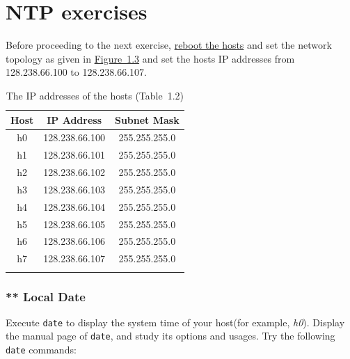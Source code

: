 \documentclass{UTNetLab}
\begin{document}
\part{NTP exercises}
   Before proceeding to the next exercise, \underline{reboot the hosts} and set the network topology as given in \hyperref[fig:1.3]{Figure~1.3} and set the hosts IP addresses from 128.238.66.100 to 128.238.66.107.
    \begin{center}
        \begin{minipage}{0.48\textwidth}
            \begin{flushleft}
                \begin{table}[H]
                    \caption{The IP addresses of the hosts (Table~1.2)}
                    \centering
                    \begin{tabular}{ c c c }
                        \hline \hline
                        Host & IP Address & Subnet Mask \\
                        \hline 
                        h0 & 128.238.66.100 & 255.255.255.0 \\
                        h1 & 128.238.66.101 & 255.255.255.0 \\
                        h2 & 128.238.66.102 & 255.255.255.0 \\
                        h3 & 128.238.66.103 & 255.255.255.0 \\
                        h4 & 128.238.66.104 & 255.255.255.0 \\
                        h5 & 128.238.66.105 & 255.255.255.0 \\
                        h6 & 128.238.66.106 & 255.255.255.0 \\
                        h7 & 128.238.66.107 & 255.255.255.0 \\
                        \hline \hline
                        \label{table:1}
                        \end{tabular}
                \end{table}
            \end{flushleft}
        \end{minipage}
    \end{center}

\section{** Local Date}
   Execute \lstinline{date} to display the system time of your host(for example, \textit{h0}). Display the manual page of \lstinline{date}, and study its options and usages. Try the following \lstinline{date} commands:
\end{document}
